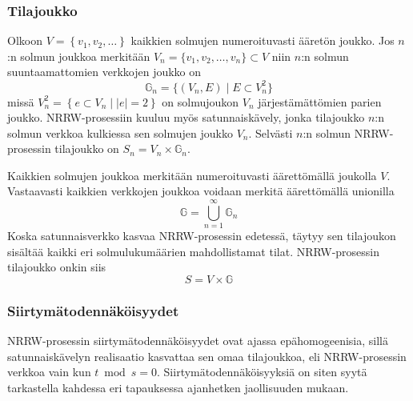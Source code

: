 \documentclass[finnish, 12pt, a4paper, sci, utf8, pdfa]{aaltothesis}
\begin{document}
\subsubsection{Tilajoukko}

Olkoon $ V = \left\{ v_{1}, v_{2}, \ldots \right\} $ kaikkien solmujen numeroituvasti ääretön joukko. Jos $ n $:n solmun joukkoa merkitään $ V_{n} = \{ v_{1}, v_{2}, \ldots , v_{n} \} \subset V $ niin $ n $:n solmun suuntaamattomien verkkojen joukko on
\[
   \mathbb{G}_{n} = \{ (V_{n}, E) \mid E \subset V_{n}^{2}  \}
\]
missä $ V_{n}^{2} = \left\{ e \subset V_{n} \mid |e| = 2 \right\} $ on solmujoukon $ V_{n} $ järjestämättömien parien joukko. NRRW-prosessiin kuuluu myös satunnaiskävely, jonka tilajoukko $ n $:n solmun verkkoa kulkiessa sen solmujen joukko $ V_{n} $. Selvästi $ n $:n solmun NRRW-prosessin tilajoukko on $ S_{n} = V_{n} \times \mathbb{G}_{n} $.

Kaikkien solmujen joukkoa merkitään numeroituvasti äärettömällä joukolla $ V $. Vastaavasti kaikkien verkkojen joukkoa voidaan merkitä äärettömällä unionilla
\begin{equation}
   \mathbb{G} = \bigcup_{n = 1}^{\infty} \mathbb{G}_{n}
\end{equation}
Koska satunnaisverkko kasvaa NRRW-prosessin edetessä, täytyy sen tilajoukon sisältää kaikki eri solmulukumäärien mahdollistamat tilat. NRRW-prosessin tilajoukko onkin siis
\begin{equation}
   S = V \times \mathbb{G}
   \label{equation:tilajoukko}
\end{equation}

\subsubsection{Siirtymätodennäköisyydet}

NRRW-prosessin siirtymätodennäköisyydet ovat ajassa epähomogeenisia, sillä satunnaiskävelyn realisaatio kasvattaa sen omaa tilajoukkoa, eli NRRW-prosessin verkkoa vain kun $ t \bmod s = 0 $. Siirtymätodennäköisyyksiä on siten syytä tarkastella kahdessa eri tapauksessa ajanhetken jaollisuuden mukaan. 
\end{document}
